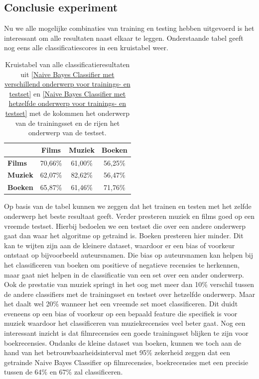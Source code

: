 \begin{appendices}
\section{Conclusie experiment}\label{Conclusie experiment}

Nu we alle mogelijke combinaties van training en testing hebben uitgevoerd is het interessant om alle resultaten naast elkaar te leggen. Onderstaande tabel geeft nog eens alle classificatiescores in een kruistabel weer.

\begin{table}[h]
\centering
\begin{tabular}{l|c|c|c|}
\cline{2-4}
                                      & \textbf{Films} & \textbf{Muziek} & \textbf{Boeken} \\ \hline
\multicolumn{1}{|l|}{\textbf{Films}} & 70,66\%         & 61,00\%         & 56,25\%         \\ \hline
\multicolumn{1}{|l|}{\textbf{Muziek}} & 62,07\%         & 82,62\%         & 56,47\%         \\ \hline
\multicolumn{1}{|l|}{\textbf{Boeken}} & 65,87\%         & 61,46\%         & 71,76\%         \\ \hline
\end{tabular}
\label{tab:alles}
\caption{Kruistabel van alle classificatieresultaten uit \ref{Naive Bayes Classifier met verschillend onderwerp voor trainings- en testset} en \ref{Naive Bayes Classifier met hetzelfde onderwerp voor trainings- en testset} met de kolommen het onderwerp van de trainingsset en de rijen het onderwerp van de testset.} 
\end{table}


Op basis van de tabel kunnen we zeggen dat het trainen en testen met het zelfde onderwerp het beste resultaat geeft. Verder presteren muziek en films goed op een vreemde testset. Hierbij bedoelen we een testset die over een andere onderwerp gaat dan waar het algoritme op getraind is.  Boeken presteren hier minder. Dit kan te wijten zijn aan de kleinere dataset, waardoor er een bias of voorkeur ontstaat op bijvoorbeeld auteursnamen. Die bias op auteursnamen kan helpen bij het classificeren van boeken om positieve of negatieve recensies te herkennen, maar gaat niet helpen in de classificatie van een set over een ander onderwerp. Ook de prestatie van muziek springt in het oog met meer dan 10\% verschil tussen de andere classifiers met de trainingsset en testset over hetzelfde onderwerp. Maar het daalt wel 20\% wanneer het een vreemde set moet classificeren. Dit duidt eveneens op een bias of voorkeur op een bepaald feature die specifiek is voor muziek waardoor het classificeren van muziekrecensies veel beter gaat. Nog een interessant inzicht is dat filmrecensies een goede trainingsset blijken te zijn voor boekrecensies.  Ondanks de kleine dataset van boeken, kunnen we toch aan de hand van het betrouwbaarheidsinterval met 95\% zekerheid zeggen dat een getrainde Naive Bayes Classifier op filmrecensies, boekrecensies met een precisie tussen de 64\% en 67\% zal classificeren.\\


\end{appendices}
